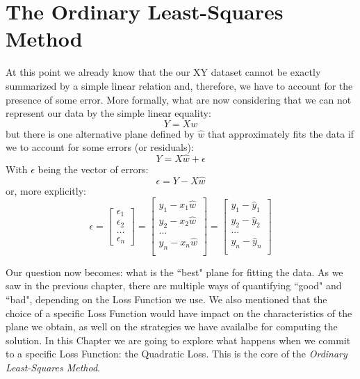 \section{The Ordinary Least-Squares Method}

At this point we already know that the our XY dataset cannot be exactly summarized by a simple linear relation and, therefore, we have to account for the presence of some error. More formally, what are now considering that we can not represent our data by the simple linear equality:
\begin{equation}
Y = X w 
\end{equation}
but there is one alternative plane defined by $\hat{w}$ that approximately fits the data if we to account for some errors (or residuals):
\begin{equation}
Y = X \hat{w} + \epsilon
\end{equation}
With $\epsilon$ being the vector of errors:
\begin{equation}
\epsilon = Y - X \hat{w}
\end{equation}
or, more explicitly:
\begin{equation}
\epsilon 
=
\begin{bmatrix}
\epsilon_1 \\
\epsilon_2 \\
... \\
\epsilon_n
\end{bmatrix}
=
\begin{bmatrix}
y_1 - x_1\hat{w} \\
y_2 - x_2\hat{w} \\
... \\
y_n - x_n\hat{w} \\
\end{bmatrix}
=
\begin{bmatrix}
y_1 - \hat{y}_1 \\
y_2 - \hat{y}_2 \\
... \\
y_n - \hat{y}_n \\
\end{bmatrix}
\end{equation}

Our question now becomes: what is the ``best" plane for fitting the data. As we saw in the previous chapter, there are multiple ways of quantifying ``good" and ``bad", depending on the Loss Function we use. We also mentioned that the choice of a specific Loss Function would have impact on the characteristics of the plane we obtain, as well on the strategies we have availalbe for computing the solution. In this Chapter we are going to explore what happens when we commit to a specific Loss Function: the Quadratic Loss. This is the core of the \emph{Ordinary Least-Squares Method}.


